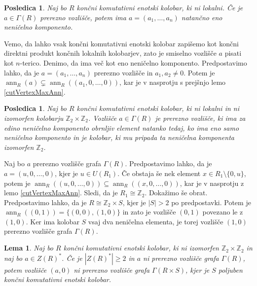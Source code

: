 \documentclass[a4paper, 12pt]{amsart}
\theoremstyle{definition} %
\theoremstyle{plain} %
\newtheorem{lema}[definicija]{Lema}
\newtheorem{posledica}[definicija]{Posledica}
\newcommand{\Z}{\mathbb Z}
\DeclareMathOperator{\ann}{ann}
\begin{document}
\begin{posledica}
\label{cutVertexOneNonzeroComponent}
Naj bo $R$ končni komutativni enotski kolobar, ki ni lokalni. Če je $a\in \Gamma(R)$ prerezno vozlišče, potem ima $a= (a_1,\dots,a_n)$ natančno eno neničelno komponento.
\end{posledica}

\proof
Vemo, da lahko vsak končni komutativni enotski kolobar zapišemo kot končni direktni produkt končnih lokalnih kolobarjev, zato je smiselno vozlišče $a$ pisati kot $n$-terico. Denimo, da ima več kot eno neničelno komponento. Predpostavimo lahko, da je $a=(a_1,\dots,a_n)$ prerezno vozlišče in $a_1,a_2 \neq 0$. Potem je $\ann_R(a) \subsetneq \ann_R((a_1,0,\dots,0))$, kar je v nasprotju s prejšnjo lemo \ref{cutVertexMaxAnn}.
\endproof

\begin{posledica}
\label{cutVertexUnitNonzeroComponent}
Naj bo $R$ končni komutativni enotski kolobar, ki ni lokalni in ni izomorfen kolobarju $\Z_2 \times \Z_2$. Vozlišče $a\in \Gamma(R)$ je prerezno vozlišče, ki ima za edino neničelno komponento obrnljiv element natanko tedaj, ko ima eno samo neničelno komponento in je kolobar, ki mu pripada ta neničelna komponenta izomorfen $\Z_2$.
\end{posledica}

\proof
Naj bo $a$ prerezno vozlišče grafa $\Gamma(R)$. Predpostavimo lahko, da je $a=(u,0,\dots,0)$, kjer je $u\in U(R_1)$. Če obstaja še nek element $x\in R_1 \setminus\{0,u\}$, potem je $\ann_R((u,0,\dots,0)) \subseteq \ann_R((x,0,\dots,0))$, kar je v nasprotju z lemo \ref{cutVertexMaxAnn}. Sledi, da je $R_1\cong \Z_2$.
Dokažimo še obrat. Predpostavimo lahko, da je $R\cong \Z_2 \times S$, kjer je $|S|>2$ po predpostavki. Potem je $\ann_R((0,1)) = \{(0,0),(1,0)\}$ in zato je vozlišče $(0,1)$ povezano le z $(1,0)$. Ker ima kolobar $S$ vsaj dva neničelna elementa, je torej vozlišče $(1,0)$ prerezno vozlišče grafa $\Gamma(R)$. 
\endproof

\begin{lema}
\label{notCutVertexProduct}
Naj bo $R$ končni komutativni enotski kolobar, ki ni izomorfen $\Z_2 \times \Z_2$ in naj bo $a\in Z(R)^*$. Če je $|Z(R)^*| \ge 2$ in $a$ ni prerezno vozlišče grafa $\Gamma(R)$, potem vozlišče $(a,0)$ ni prerezno vozlišče grafa $\Gamma(R\times S)$, kjer je $S$ poljuben končni komutativni enotski kolobar.
\end{lema}
\end{document}
